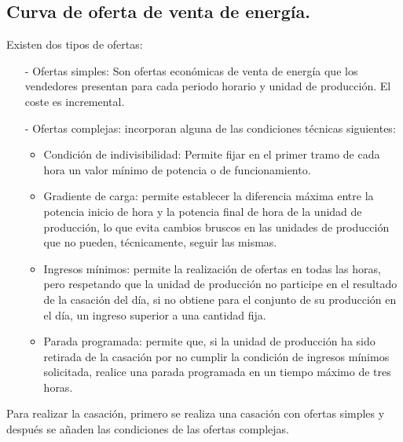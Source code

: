 \subsection{Curva de oferta de venta de energía.}
Existen dos tipos de ofertas:
\begin{itemize}
	\item [-] Ofertas simples: Son ofertas económicas de venta de energía que los vendedores presentan para
	cada periodo horario y unidad de producción. El coste es incremental.
	\item [-] Ofertas complejas: incorporan alguna de las condiciones técnicas siguientes:
	\begin{itemize}
		\item Condición de indivisibilidad: Permite fijar en el primer tramo de cada hora un valor mínimo de potencia o de
		funcionamiento.
		\item Gradiente de carga: permite establecer la diferencia máxima entre la potencia inicio de hora y la potencia final de
		hora de la unidad de producción, lo que evita cambios bruscos en las unidades de producción
		que no pueden, técnicamente, seguir las mismas.
		\item Ingresos mínimos:  permite la realización de ofertas en todas las horas, pero respetando que la unidad de
		producción no participe en el resultado de la casación del día, si no obtiene para el conjunto
		de su producción en el día, un ingreso superior a una cantidad fija.
		\item Parada programada: permite que, si la unidad de producción ha sido retirada de la casación por no cumplir la
		condición de ingresos mínimos solicitada, realice una parada programada en un tiempo
		máximo de tres horas.
	\end{itemize}
\end{itemize}
Para realizar la casación, primero se realiza una casación con ofertas simples  y después se añaden las condiciones de las ofertas complejas.
